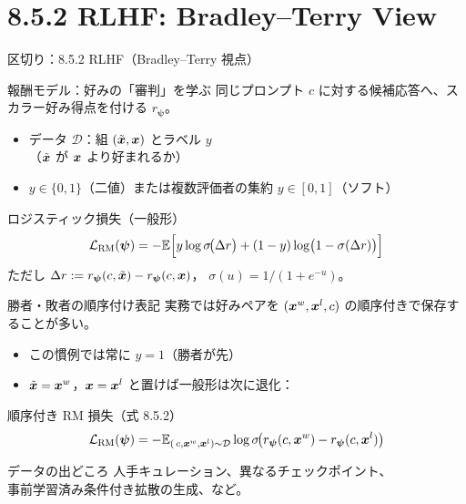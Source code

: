 \section{8.5.2 RLHF: Bradley--Terry View}
\asmain
\begin{frame}{区切り：8.5.2 RLHF（Bradley--Terry 視点）}
    \tableofcontents[currentsection]
\end{frame}
\asmain
\begin{frame}{報酬モデル：好みの「審判」を学ぶ}
    同じプロンプト $c$ に対する候補応答へ、スカラー好み得点を付ける $r_{\bm{\psi}}$。
    \begin{itemize}
        \item データ $\mathcal{D}$：組 $(\tilde{\bm{x}},\bm{x})$ とラベル $y$\\
        （$\tilde{\bm{x}}$ が $\bm{x}$ より好まれるか）
        \item $y\in\{0,1\}$（二値）または複数評価者の集約 $y\in[0,1]$（ソフト）
    \end{itemize}
    \begin{block}{ロジスティック損失（一般形）}
        \[
            \mathcal{L}_{\mathrm{RM}}(\bm{\psi})
            =
            -\mathbb{E}
            \Bigl[
            y\log\sigma\!\bigl(\Delta r\bigr)
            +(1-y)\log\bigl(1-\sigma(\Delta r)\bigr)
            \Bigr]
        \]
        ただし $\Delta r:=r_{\bm{\psi}}(c,\tilde{\bm{x}})-r_{\bm{\psi}}(c,\bm{x})$，
        $\sigma(u)=1/(1+e^{-u})$。
    \end{block}
\end{frame}
\asmain
\begin{frame}{勝者・敗者の順序付け表記}
    実務では好みペアを $(\bm{x}^w,\bm{x}^l,c)$ の順序付きで保存することが多い。
    \begin{itemize}
        \item この慣例では常に $y=1$（勝者が先）
        \item $\tilde{\bm{x}}=\bm{x}^w$，$\bm{x}=\bm{x}^l$ と置けば一般形は次に退化：
    \end{itemize}
    \begin{block}{順序付き RM 損失（式 8.5.2）}
        \[
            \mathcal{L}_{\mathrm{RM}}(\bm{\psi})
            =
            -\mathbb{E}_{(\,c,\bm{x}^w,\bm{x}^l)\sim\mathcal{D}}
            \log\sigma\!\bigl(
            r_{\bm{\psi}}(c,\bm{x}^w)-r_{\bm{\psi}}(c,\bm{x}^l)
            \bigr)
        \]
    \end{block}
    \begin{exampleblock}{データの出どころ}
        人手キュレーション、異なるチェックポイント、\\
        事前学習済み条件付き拡散の生成、など。
    \end{exampleblock}
\end{frame}
